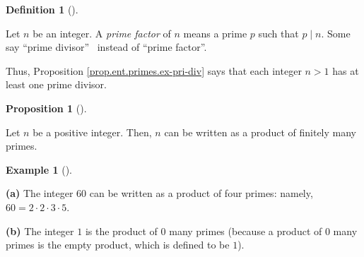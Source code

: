 \documentclass[numbers=enddot,12pt,final,onecolumn,notitlepage]{scrartcl}%
\numberwithin{exer}{subsection}
\theoremstyle{definition}
\newtheorem{prop}[theo]{Proposition}
\newenvironment{proposition}[1][]
{\begin{prop}[#1]\begin{leftbar}}
{\end{leftbar}\end{prop}}
\newtheorem{defi}[theo]{Definition}
\newenvironment{definition}[1][]
{\begin{defi}[#1]\begin{leftbar}}
{\end{leftbar}\end{defi}}
\newtheorem{exam}[theo]{Example}
\newenvironment{example}[1][]
{\begin{exam}[#1]\begin{leftbar}}
{\end{leftbar}\end{exam}}
\begin{document}
\begin{definition}
Let $n$ be an integer. A \textit{prime factor} of $n$ means a prime $p$ such
that $p\mid n$. Some say \textquotedblleft prime divisor\textquotedblright%
\ instead of \textquotedblleft prime factor\textquotedblright.
\end{definition}

Thus, Proposition \ref{prop.ent.primes.ex-pri-div} says that each integer
$n>1$ has at least one prime divisor.

\begin{proposition}
\label{prop.ent.primes.fac-ex}Let $n$ be a positive integer. Then, $n$ can be
written as a product of finitely many primes.
\end{proposition}

\begin{example}
\label{exa.ent.primes.fac-ex}\textbf{(a)} The integer $60$ can be written as a
product of four primes: namely, $60=2\cdot2\cdot3\cdot5$.

\textbf{(b)} The integer $1$ is the product of $0$ many primes (because a
product of $0$ many primes is the empty product, which is defined to be $1$).
\end{example}
\end{document}
